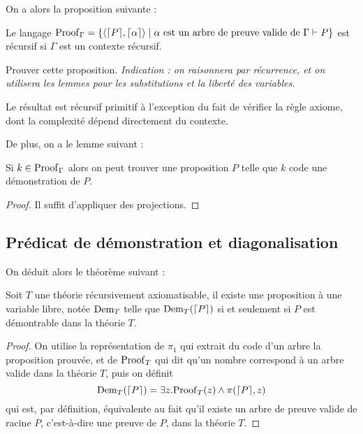 On a alors la proposition suivante :

\begin{prop}
    Le langage $\mathrm{Proof}_{\Gamma} =\{\langle\lceil P \rceil,\lceil \alpha \rceil\rangle\mid \alpha\text{ est un arbre de preuve valide de } \Gamma\vdash P\}$ est récursif si $\Gamma$ est un contexte récursif.
\end{prop}

\begin{exo}
    Prouver cette proposition. \textit{Indication : on raisonnera par récurrence, et on utilisera les lemmes pour les substitutions et la liberté des variables.}
\end{exo}

\begin{rmk}
    Le résultat est récursif primitif à l'exception du fait de vérifier la règle axiome, dont la complexité dépend directement du contexte.
\end{rmk}

De plus, on a le lemme suivant :

\begin{lem}
    Si $k\in\mathrm{Proof}_\Gamma$ alors on peut trouver une proposition $P$ telle que $k$ code une démonstration de $P$.
\end{lem}

\begin{proof}
    Il suffit d'appliquer des projections.
\end{proof}

\subsection{Prédicat de démonstration et diagonalisation}

On déduit alors le théorème suivant :

\begin{them}
    Soit $T$ une théorie récursivement axiomatisable, il existe une proposition à une variable libre, notée $\mathrm{Dem}_T$ telle que $\mathrm{Dem}_T(\lceil P \rceil)$ si et seulement si $P$ est démontrable dans la théorie $T$.
\end{them}

\begin{proof}
    On utilise la représentation de $\pi_1$ qui extrait du code d'un arbre la proposition prouvée, et de $\mathrm{Proof}_T$ qui dit qu'un nombre correspond à un arbre valide dans la théorie $T$, puis on définit $$\mathrm{Dem}_T(\lceil P \rceil) = \exists z. \mathrm{Proof}_T(z) \land \pi(\lceil P \rceil,z)$$ qui est, par définition, équivalente au fait qu'il existe un arbre de preuve valide de racine $P$, c'est-à-dire une preuve de $P$, dans la théorie $T$.
\end{proof}

